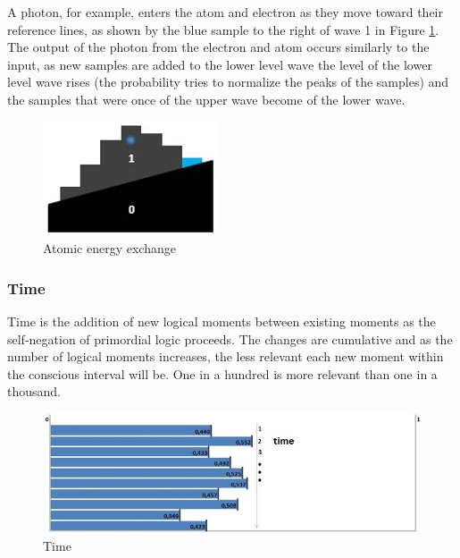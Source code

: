 A photon, for example, enters the atom and electron as they move toward their reference lines, as shown by the blue sample to the right of wave 1 in Figure \ref{fig:consciousness_jump_photon.jpg}. The output of the photon from the electron and atom occurs similarly to the input, as new samples are added to the lower level wave the level of the lower level wave rises (the probability tries to normalize the peaks of the samples) and the samples that were once of the upper wave become of the lower wave.
	\begin{figure}[H]
	\caption{Atomic energy exchange}
	\label{fig:consciousness_jump_photon.jpg}
	\centering
	\includegraphics[scale=.8]{sections/images/consciousness_jump_photon.jpg}
	\end{figure}
	
\subsubsection{Time}
Time is the addition of new logical moments between existing moments as the self-negation of primordial logic proceeds. The changes are cumulative and as the number of logical moments increases, the less relevant each new moment within the conscious interval will be. One in a hundred is more relevant than one in a thousand. 
	\begin{figure}[H]
	\caption{Time}
	\label{fig:consciousness_time}
	\centering
	\includegraphics[scale=.8]{sections/images/consciousness_time.jpg}
	\end{figure}

